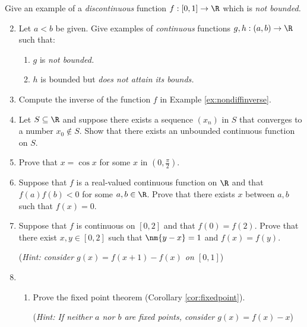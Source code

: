 \begin{exercisessec}{}{}
\exstart Give an example of a \emph{discontinuous} function $f:[0,1]\to\R$ which is \emph{not bounded.}
\begin{enumerate}\setcounter{enumi}{1}
  \item Let $a<b$ be given. Give examples of \emph{continuous} functions $g,h:(a,b)\to\R$ such that:
	\begin{enumerate}
		 \item $g$ is \emph{not bounded.}
		 \item $h$ is bounded but \emph{does not attain its bounds.}
	\end{enumerate}
	
  
  \item Compute the inverse of the function $f$ in Example \ref{ex:nondiffinverse}.
  
  \item%
  Let $S\subseteq\R$ and suppose there exists a sequence $(x_n)$ in $S$ that converges to a number $x_0\not\in S$. Show that there exists an unbounded continuous function on $S$.
  
  \item%
  Prove that $x=\cos x$ for some $x$ in $(0,\tfrac\pi 2)$.
  
  \item%
  Suppose that $f$ is a real-valued continuous function on $\R$ and that $f(a)f(b)<0$ for some $a,b\in\R$. Prove that there exists $x$ between $a,b$ such that $f(x)=0$.
  
  \item%
  Suppose that $f$ is continuous on $[0,2]$ and that $f(0)=f(2)$. Prove that there exist $x,y\in[0,2]$ such that $\nm{y-x}=1$ and $f(x)=f(y)$.\par
  (\emph{Hint: consider $g(x)=f(x+1)-f(x)$ on $[0,1]$})
  
  
  
 	\item\begin{enumerate}
 	  \item Prove the fixed point theorem (Corollary \ref{cor:fixedpoint}).\par
 	  (\emph{Hint: If neither $a$ nor $b$ are fixed points, consider $g(x)=f(x)-x$}) 
 	  

\end{enumerate}
\end{enumerate}
\end{exercisessec}
